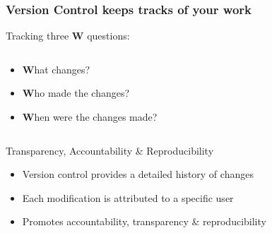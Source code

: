 \documentclass[xcolor=x11names,compress]{beamer}
\renewcommand{\(}{\begin{columns}}
\renewcommand{\)}{\end{columns}}
\newcommand{\<}[1]{\begin{column}{#1}}
\renewcommand{\>}{\end{column}}
\begin{document}
\begin{frame} %
\frametitle{Version Control keeps tracks of your work}
Tracking three \textbf{W} questions:
\begin{columns}[t]
 \begin{column}{0.5\textwidth}
 \begin{itemize}[<+->]
 \item[] \textcolor{siap}{\textbf{W}}hat changes?
 \item[] \textcolor{siap}{\textbf{W}}ho made the changes?
 \item[] \textcolor{siap}{\textbf{W}}hen were the changes made?
 \end{itemize}
 \end{column}
  \begin{column}{0.5\textwidth}
    \begin{center}
    \begin{itemize}
    \end{itemize}
    \end{center}
  \end{column}
\end{columns}
\end{frame}



\begin{frame}{Transparency, Accountability \& Reproducibility}
    \begin{itemize}[<+->]
        \item Version control provides a detailed history of changes
        \item Each modification is attributed to a specific user
        \item Promotes accountability, transparency \&  reproducibility
    \end{itemize}
\end{frame}
\end{document}
